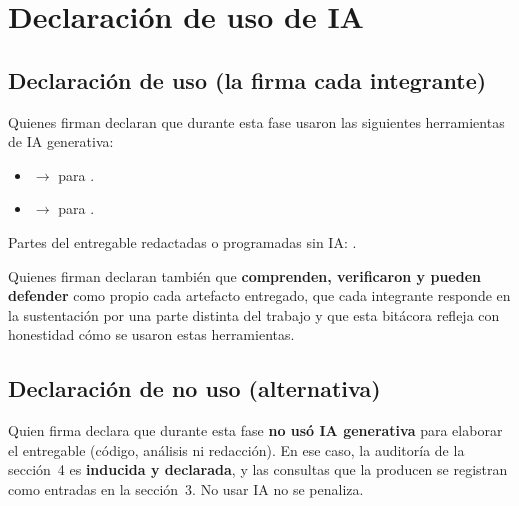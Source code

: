 \section{Declaración de uso de IA}

\subsection*{Declaración de uso (la firma cada integrante)}

Quienes firman declaran que durante esta fase usaron las siguientes herramientas de IA generativa:

\begin{itemize}[leftmargin=1.5em]
  \item \textbf{} $\rightarrow$ para .
  \item \textbf{} $\rightarrow$ para .
\end{itemize}

Partes del entregable redactadas o programadas sin IA: .

Quienes firman declaran también que \textbf{comprenden, verificaron y pueden defender} como propio cada artefacto entregado, que cada integrante responde en la sustentación por una parte distinta del trabajo y que esta bitácora refleja con honestidad cómo se usaron estas herramientas.

\begin{firmas}
\end{firmas}

\subsection*{Declaración de no uso (alternativa)}

Quien firma declara que durante esta fase \textbf{no usó IA generativa} para elaborar el entregable (código, análisis ni redacción). En ese caso, la auditoría de la sección~4 es \textbf{inducida y declarada}, y las consultas que la producen se registran como entradas en la sección~3. No usar IA no se penaliza.

\begin{firmas}
\end{firmas}

